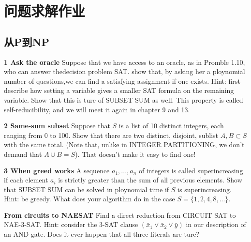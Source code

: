 \documentclass[a4paper,UTF8]{article}
\begin{document}
\section*{问题求解作业}
\subsection{从P到NP}
\textbf{1 Ask the oracle} Suppose that we have access to an oracle, as in Promble 1.10,
who can answer thedecision problem SAT. show that, by asking her a ploynomial
number of questions,we can find a satisfying assignment if one exists. Hint:
first describe how setting a variable gives a smaller SAT formula on the remaining
variable. Show that this is ture of SUBSET SUM as well. This property is called
self-reducibility, and we will meet it again in chapter 9 and 13.

 \vspace{6pt}

\textbf{2 Same-sum subset} Suppose that $S$ is a list of 10 distinct integers, each
ranging from 0 to 100. Show that there are two distinct, disjoint, sublist $A,B\subset S$
with the same total. (Note that, unlike in INTEGER PARTITIONING, we don't demand that $A\cup B = S$).
That doesn't make it easy to find one!

 \vspace{6pt}

\textbf{3 When greed works} A sequence $a_{1},...,a_{n}$ of integers is called superincreasing
if each element $a_{i}$ is strictly greater than the sum of all previous elements.
Show that SUBSET SUM can be solved in ploynomial time if $S$ is superincreasing.
Hint: be greedy. What does your algorithm do in the case $S=\{1,2,4,8,...\}$.

\vspace{6pt}

\textbf{From circuits to NAESAT} Find a direct reduction from CIRCUIT SAT to NAE-3-SAT.
Hint: consider the 3-SAT clause $(\bar{x}_{1} \vee \bar{x}_{2} \vee \bar{y})$ in our description
of an AND gate. Does it ever happen that all three literals are ture?
\end{document}
